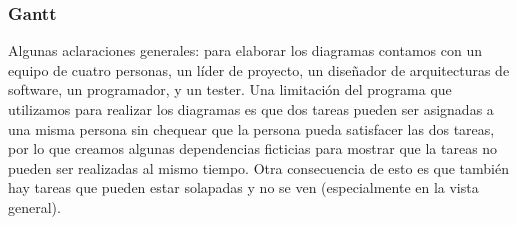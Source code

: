 
\subsubsection{Gantt}

Algunas aclaraciones generales: para elaborar los diagramas contamos con un equipo de cuatro personas, un l\'ider de proyecto, un diseñador de arquitecturas de software, un programador, y un tester. Una limitaci\'on del programa que utilizamos para realizar los diagramas es que dos tareas pueden ser asignadas a una misma persona sin chequear que la persona pueda satisfacer las dos tareas, por lo que creamos algunas dependencias ficticias para mostrar que la tareas no pueden ser realizadas al mismo tiempo. Otra consecuencia de esto es que tambi\'en hay tareas que pueden estar solapadas y no se ven (especialmente en la vista general).


